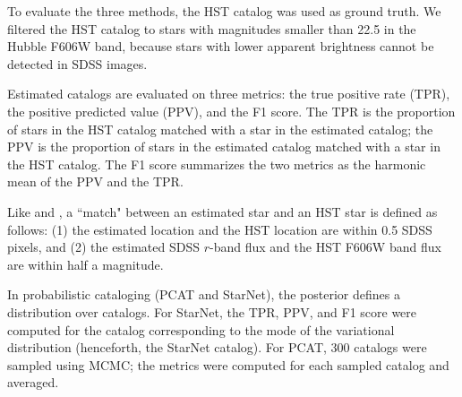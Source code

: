 To evaluate the three methods, the HST catalog was used as ground truth.
We filtered the HST catalog to stars with magnitudes smaller than 22.5 in the Hubble F606W band,
because stars with lower apparent brightness cannot be detected in SDSS images.


Estimated catalogs are evaluated on three metrics: the true positive rate (TPR),
the positive predicted value (PPV), and the F1 score.
The TPR is the proportion of stars in the HST catalog matched with a star in the estimated catalog;
the PPV is the proportion of stars in the estimated catalog matched with a star in the HST catalog.
The F1 score summarizes the two metrics as the harmonic mean of the PPV and the TPR.

Like \cite{Portillo_2017} and \cite{Feder_2019}, a ``match" between an estimated star
and an HST star is defined as follows: (1) the estimated location and the HST location are within 0.5 SDSS pixels,
and (2) the estimated SDSS $r$-band flux and the HST F606W band flux are within half a magnitude.

In probabilistic cataloging (PCAT and StarNet), the posterior defines a distribution over catalogs.
For StarNet, the TPR, PPV, and F1 score were computed for the catalog corresponding to the mode of the variational distribution (henceforth, the StarNet catalog).
For PCAT, 300 catalogs were sampled using MCMC; the metrics were computed for each sampled catalog and averaged.

